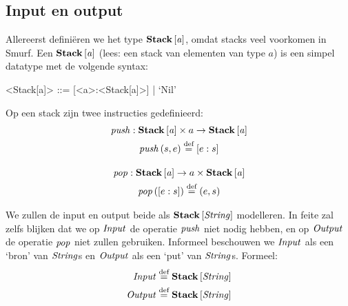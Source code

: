\subsection{Input en output}
\label{sec:def:io}

Allereerst definiëren we het type $\mathbf{Stack}\left[\mathit{a}\right]$, omdat stacks veel voorkomen in
Smurf. Een $\mathbf{Stack}\left[\mathit{a}\right]$ (lees: een stack van elementen van type $a$) is een
simpel datatype met de volgende syntax:

\begin{grammar}
	<Stack[a]> ::= [<a>:<Stack[a]>] | `Nil'
\end{grammar}

Op een stack zijn twee instructies gedefinieerd:
\begin{gather*}
	\mathit{push} : \mathbf{Stack}\left[\mathit{a}\right] \times a \to \mathbf{Stack}\left[\mathit{a}\right] \\
	\mathit{push}\left(s, e\right) \stackrel{\text{def}}{=} [e:s] \\[1em]
	\mathit{pop} : \mathbf{Stack}\left[\mathit{a}\right] \to a \times \mathbf{Stack}\left[\mathit{a}\right] \\
	\mathit{pop}\left([e:s]\right) \stackrel{\text{def}}{=} (e,s) \\
\end{gather*}

\medskip
We zullen de input en output beide als $\mathbf{Stack}\left[\mathit{\mathit{String}}\right]$ modelleren. In feite
zal zelfs blijken dat we op $\mathit{Input}$ de operatie $\mathit{push}$ niet nodig hebben,
en op $\mathit{Output}$ de operatie $\mathit{pop}$ niet zullen gebruiken. Informeel
beschouwen we $\mathit{Input}$ als een `bron' van $\mathit{String}$s en $\mathit{Output}$ als een `put'
van $\mathit{String}$s. Formeel:
\begin{align*}
	\mathit{Input} &\stackrel{\text{def}}{=} \mathbf{Stack}\left[\mathit{\mathit{String}}\right] \\ \mathit{Output} &\stackrel{\text{def}}{=} \mathbf{Stack}\left[\mathit{\mathit{String}}\right]
\end{align*}

